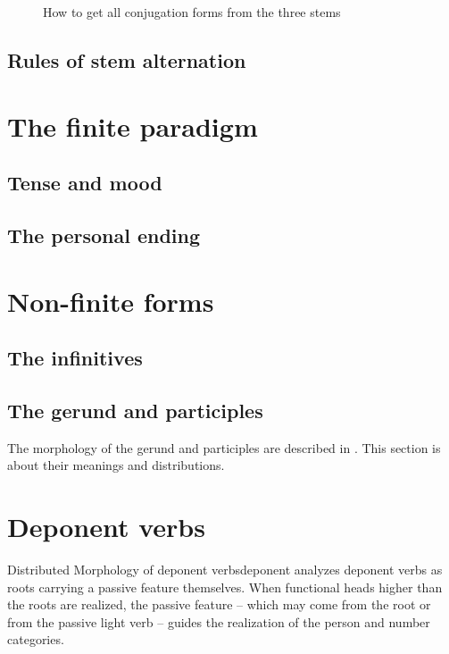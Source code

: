 \documentclass[UTF8, a4paper, oneside]{report}
\begin{document}
\begin{sidewaysfigure}
    \centering
    
    \caption{How to get all conjugation forms from the three stems}
    \label{fig:stem-to-form}
\end{sidewaysfigure}

\subsection{Rules of stem alternation}

\section{The finite paradigm}

\subsection{Tense and mood}\label{sec:tense-mood-marking}

\subsection{The personal ending}

\section{Non-finite forms}

\subsection{The infinitives}

\subsection{The gerund and participles}

The morphology of the gerund and participles are described in .
This section is about their meanings and distributions.

\section{Deponent verbs}

\begin{theorybox}{Distributed Morphology of deponent verbs}{deponent}
    \citet{embick2000features} analyzes deponent verbs as roots carrying a passive feature themselves.
    When functional heads higher than the roots are realized,
    the passive feature -- which may come from the root or from the passive light verb -- 
    guides the realization of the person and number categories.
\end{theorybox}
\end{document}
